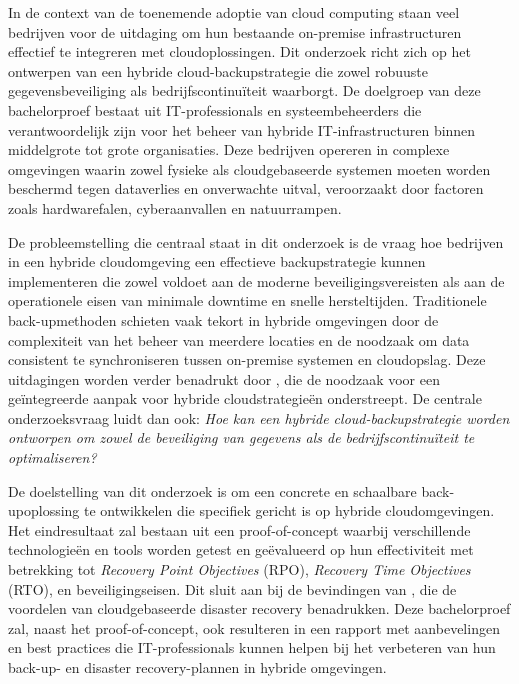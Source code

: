 


In de context van de toenemende adoptie van cloud computing staan veel bedrijven voor de uitdaging om hun bestaande on-premise infrastructuren effectief te integreren met cloudoplossingen. Dit onderzoek richt zich op het ontwerpen van een hybride cloud-backupstrategie die zowel robuuste gegevensbeveiliging als bedrijfscontinuïteit waarborgt. De doelgroep van deze bachelorproef bestaat uit IT-professionals en systeembeheerders die verantwoordelijk zijn voor het beheer van hybride IT-infrastructuren binnen middelgrote tot grote organisaties. Deze bedrijven opereren in complexe omgevingen waarin zowel fysieke als cloudgebaseerde systemen moeten worden beschermd tegen dataverlies en onverwachte uitval, veroorzaakt door factoren zoals hardwarefalen, cyberaanvallen en natuurrampen.

De probleemstelling die centraal staat in dit onderzoek is de vraag hoe bedrijven in een hybride cloudomgeving een effectieve backupstrategie kunnen implementeren die zowel voldoet aan de moderne beveiligingsvereisten als aan de operationele eisen van minimale downtime en snelle hersteltijden. Traditionele back-upmethoden schieten vaak tekort in hybride omgevingen door de complexiteit van het beheer van meerdere locaties en de noodzaak om data consistent te synchroniseren tussen on-premise systemen en cloudopslag. Deze uitdagingen worden verder benadrukt door \textcite{Yanamala2024}, die de noodzaak voor een geïntegreerde aanpak voor hybride cloudstrategieën onderstreept. De centrale onderzoeksvraag luidt dan ook: \textit{Hoe kan een hybride cloud-backupstrategie worden ontworpen om zowel de beveiliging van gegevens als de bedrijfscontinuïteit te optimaliseren?}

De doelstelling van dit onderzoek is om een concrete en schaalbare back-upoplossing te ontwikkelen die specifiek gericht is op hybride cloudomgevingen. Het eindresultaat zal bestaan uit een proof-of-concept waarbij verschillende technologieën en tools worden getest en geëvalueerd op hun effectiviteit met betrekking tot \textit{Recovery Point Objectives} (RPO), \textit{Recovery Time Objectives} (RTO), en beveiligingseisen. Dit sluit aan bij de bevindingen van \textcite{VinayakBhuvi}, die de voordelen van cloudgebaseerde disaster recovery benadrukken. Deze bachelorproef zal, naast het proof-of-concept, ook resulteren in een rapport met aanbevelingen en best practices die IT-professionals kunnen helpen bij het verbeteren van hun back-up- en disaster recovery-plannen in hybride omgevingen.

